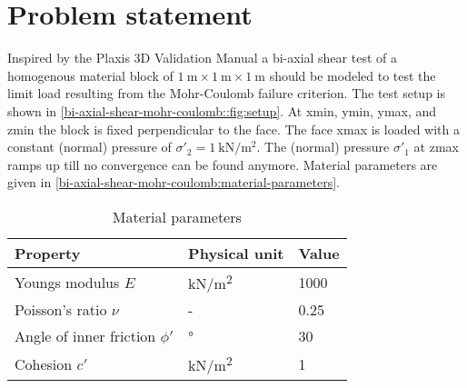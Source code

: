 \section{Problem statement}
\label{bi-axial-shear-mohr-coulomb:sec:problem-statement}

Inspired by the Plaxis 3D Validation Manual a bi-axial shear test of a
homogenous material block of $\SI{1}{\metre} \times \SI{1}{\metre} \times
    \SI{1}{\metre}$ should be modeled to test the limit load resulting from the
Mohr-Coulomb failure criterion. The test setup is shown in
\autoref{bi-axial-shear-mohr-coulomb::fig:setup}. At xmin, ymin, ymax, and zmin
the block is fixed perpendicular to the face. The face xmax is loaded with a
constant (normal) pressure of $\sigma'_2 =
    \qty{1}{\kilo\newton\per\square\metre}$. The (normal) pressure $\sigma'_1$ at
zmax ramps up till no convergence can be found anymore. Material parameters are
given in \autoref{bi-axial-shear-mohr-coulomb:material-parameters}.

\begin{table}[htbp]
    \centering
    \caption{Material parameters}
    \label{bi-axial-shear-mohr-coulomb:material-parameters}
    \begin{tabularx}{\textwidth}{XYY}

        \hline

        Property                        & Physical unit                                         & Value       \\

        \hline

        Youngs modulus $E$              & \si[per-mode = symbol]{\kilo\newton\per\square\metre} &
        \SI{1000}{}                                                                                           \\

        Poisson's ratio $\nu$           & -                                                     & \SI{0.25}{} \\

        Angle of inner friction $\phi'$ & \si[per-mode = symbol]{\degree}                       & \SI{30}{}
        \\

        Cohesion $c'$                   & \si[per-mode = symbol]{\kilo\newton\per\square\metre} & 1           \\

        \hline
    \end{tabularx}
\end{table}

